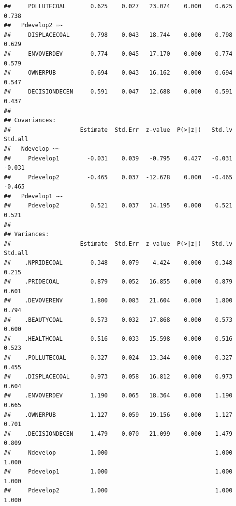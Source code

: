 \documentclass[
]{article}
\begin{document}
\begin{verbatim}
##     POLLUTECOAL       0.625    0.027   23.074    0.000    0.625    0.738
##   Pdevelop2 =~                                                          
##     DISPLACECOAL      0.798    0.043   18.744    0.000    0.798    0.629
##     ENVOVERDEV        0.774    0.045   17.170    0.000    0.774    0.579
##     OWNERPUB          0.694    0.043   16.162    0.000    0.694    0.547
##     DECISIONDECEN     0.591    0.047   12.688    0.000    0.591    0.437
## 
## Covariances:
##                    Estimate  Std.Err  z-value  P(>|z|)   Std.lv  Std.all
##   Ndevelop ~~                                                           
##     Pdevelop1        -0.031    0.039   -0.795    0.427   -0.031   -0.031
##     Pdevelop2        -0.465    0.037  -12.678    0.000   -0.465   -0.465
##   Pdevelop1 ~~                                                          
##     Pdevelop2         0.521    0.037   14.195    0.000    0.521    0.521
## 
## Variances:
##                    Estimate  Std.Err  z-value  P(>|z|)   Std.lv  Std.all
##    .NPRIDECOAL        0.348    0.079    4.424    0.000    0.348    0.215
##    .PRIDECOAL         0.879    0.052   16.855    0.000    0.879    0.601
##    .DEVOVERENV        1.800    0.083   21.604    0.000    1.800    0.794
##    .BEAUTYCOAL        0.573    0.032   17.868    0.000    0.573    0.600
##    .HEALTHCOAL        0.516    0.033   15.598    0.000    0.516    0.523
##    .POLLUTECOAL       0.327    0.024   13.344    0.000    0.327    0.455
##    .DISPLACECOAL      0.973    0.058   16.812    0.000    0.973    0.604
##    .ENVOVERDEV        1.190    0.065   18.364    0.000    1.190    0.665
##    .OWNERPUB          1.127    0.059   19.156    0.000    1.127    0.701
##    .DECISIONDECEN     1.479    0.070   21.099    0.000    1.479    0.809
##     Ndevelop          1.000                               1.000    1.000
##     Pdevelop1         1.000                               1.000    1.000
##     Pdevelop2         1.000                               1.000    1.000
\end{verbatim}
\end{document}
